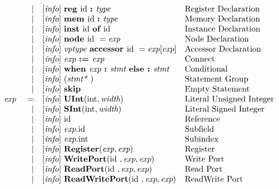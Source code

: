 \documentclass[12pt]{article}
\begin{document}
\[\begin{array}{rrll}
                &\vert &[\text{\em info}]\  \text{\bf reg\ } \text{id } \text{\bf :\ } \text{\em type\ }                                           &\text{Register Declaration}\\
                &\vert &[\text{\em info}]\  \text{\bf mem\ } \text{id } \text{\bf :\ } \text{\em type\ }                                           &\text{Memory Declaration}\\
                &\vert &[\text{\em info}]\  \text{\bf inst\ } \text{id } \text{\bf of\ } \text{id }                                               &\text{Instance Declaration}\\
                &\vert &[\text{\em info}]\  \text{\bf node\ } \text{id }  = \text{\em exp\ }                                               &\text{Node Declaration}\\
                &\vert &[\text{\em info}]\  \text{\em vptype\ }  \text{\bf accessor\ } \text{id } = \text{\em exp}[\text{\em exp}]                   &\text{Accessor Declaration}\\
                &\vert &[\text{\em info}]\  \text{\em exp\ } \text{\bf :=\ } \text{\em exp\ }                                               &\text{Connect}\\
                &\vert &[\text{\em info}]\  \text{\bf when\ } \text{\em exp\ } \text{\bf :\ } \text{\em stmt\ } \text{\bf else :\ } \text{\em stmt\ }               &\text{Conditional}\\
                &\vert &[\text{\em info}]\  (\text{\em stmt*\ })                                                            &\text{Statement Group}\\
                &\vert &[\text{\em info}]\  \text{\bf skip\ }                                                               &\text{Empty Statement}\\
\text{\em exp\ }        &=     &[\text{\em info}]\  \text{\bf UInt}(\text{int}, \text{\em width})                                          &\text{Literal Unsigned Integer}\\
                &\vert &[\text{\em info}]\  \text{\bf SInt}(\text{int}, \text{\em width})                                          &\text{Literal Signed Integer}\\
                &\vert &[\text{\em info}]\  \text{id }                                                                     &\text{Reference}\\
                &\vert &[\text{\em info}]\  \text{\em exp}.\text{id }                                                           &\text{Subfield}\\
                &\vert &[\text{\em info}]\  \text{\em exp}.\text{int}                                                         &\text{Subindex}\\
                &\vert &[\text{\em info}]\  \text{\bf Register}(\text{\em exp}, \text{\em exp})                                    &\text{Register}\\
                &\vert &[\text{\em info}]\  \text{\bf WritePort}(\text{id }, \text{\em exp}, \text{\em exp})                              &\text{Write Port}\\
                &\vert &[\text{\em info}]\  \text{\bf ReadPort}(\text{id }, \text{\em exp}, \text{\em exp})                               &\text{Read Port}\\
                &\vert &[\text{\em info}]\  \text{\bf ReadWritePort}(\text{id }, \text{\em exp}, \text{\em exp})                          &\text{ReadWrite Port}\\
\end{array}
\]
\end{document}
